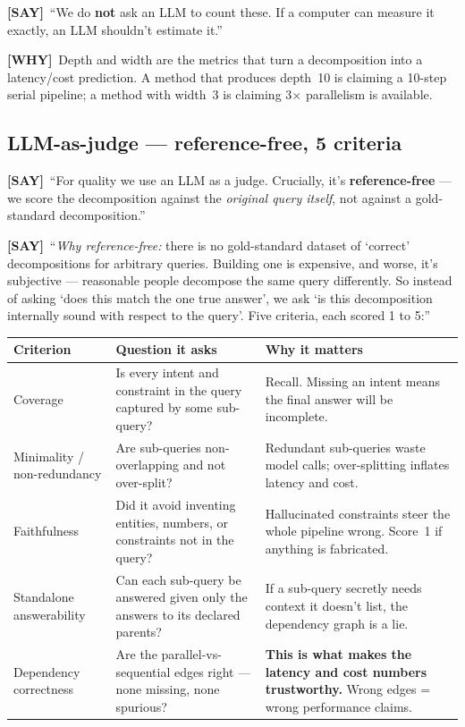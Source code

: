 \documentclass[11pt]{article}
\newcommand{\say}{\textcolor{sayc}{\textbf{[SAY]}}\ }
\newcommand{\why}{\textcolor{whyc}{\textbf{[WHY]}}\ }
\begin{document}
\say ``We do \textbf{not} ask an LLM to count these. If a computer can measure it
exactly, an LLM shouldn't estimate it.''

\why Depth and width are the metrics that turn a decomposition into a
latency/cost prediction. A method that produces depth~10 is claiming a 10-step
serial pipeline; a method with width~3 is claiming 3$\times$ parallelism is
available.

\subsection{LLM-as-judge --- reference-free, 5 criteria}

\say ``For quality we use an LLM as a judge. Crucially, it's \textbf{reference-free}
--- we score the decomposition against the \emph{original query itself}, not
against a gold-standard decomposition.''

\say ``\textit{Why reference-free:} there is no gold-standard dataset of `correct'
decompositions for arbitrary queries. Building one is expensive, and worse, it's
subjective --- reasonable people decompose the same query differently. So instead
of asking `does this match the one true answer', we ask `is this decomposition
internally sound with respect to the query'. Five criteria, each scored 1 to 5:''

\begin{tabularx}{\linewidth}{@{}>{\raggedright\arraybackslash}p{3.1cm} Y Y@{}}
\toprule
\textbf{Criterion} & \textbf{Question it asks} & \textbf{Why it matters} \\
\midrule
Coverage &
Is every intent and constraint in the query captured by some sub-query? &
Recall. Missing an intent means the final answer will be incomplete. \\
\addlinespace
Minimality / non-redundancy &
Are sub-queries non-overlapping and not over-split? &
Redundant sub-queries waste model calls; over-splitting inflates latency and cost. \\
\addlinespace
Faithfulness &
Did it avoid inventing entities, numbers, or constraints not in the query? &
Hallucinated constraints steer the whole pipeline wrong. Score~1 if anything is
fabricated. \\
\addlinespace
Standalone answerability &
Can each sub-query be answered given only the answers to its declared parents? &
If a sub-query secretly needs context it doesn't list, the dependency graph is a
lie. \\
\addlinespace
Dependency correctness &
Are the parallel-vs-sequential edges right --- none missing, none spurious? &
\textbf{This is what makes the latency and cost numbers trustworthy.} Wrong edges
= wrong performance claims. \\
\bottomrule
\end{tabularx}
\end{document}
